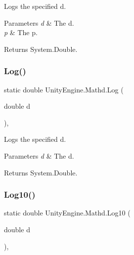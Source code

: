 Logs the specified d. 


\begin{DoxyParams}{Parameters}
{\em d} & The d.\\
\hline
{\em p} & The p.\\
\hline
\end{DoxyParams}
\begin{DoxyReturn}{Returns}
System.\+Double.
\end{DoxyReturn}
\mbox{\label{struct_unity_engine_1_1_mathd_a4708a8e01e08dafe6f8633ef16699090}} 
\subsubsection{\texorpdfstring{Log()}{Log()}\hspace{0.1cm}{\footnotesize\ttfamily [2/2]}}
{\footnotesize\ttfamily static double Unity\+Engine.\+Mathd.\+Log (\begin{DoxyParamCaption}\item[{double}]{d }\end{DoxyParamCaption})\hspace{0.3cm}{\ttfamily [inline]}, {\ttfamily [static]}}



Logs the specified d. 


\begin{DoxyParams}{Parameters}
{\em d} & The d.\\
\hline
\end{DoxyParams}
\begin{DoxyReturn}{Returns}
System.\+Double.
\end{DoxyReturn}
\mbox{\label{struct_unity_engine_1_1_mathd_a11b15e593212dfc59039aaefd6ab0afd}} 
\subsubsection{\texorpdfstring{Log10()}{Log10()}}
{\footnotesize\ttfamily static double Unity\+Engine.\+Mathd.\+Log10 (\begin{DoxyParamCaption}\item[{double}]{d }\end{DoxyParamCaption})\hspace{0.3cm}{\ttfamily [inline]}, {\ttfamily [static]}}



